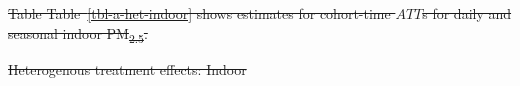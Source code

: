 \documentclass[
  letterpaper,
  DIV=11,
  numbers=noendperiod]{scrartcl}
\makeatletter
\renewenvironment{table}%
   {\renewcommand\familydefault\sfdefault
    \@float{table}}
   {\end@float}
\providecommand{\DIFdeltex}[1]{{\protect\color{red}\sout{#1}}}                      %
\providecommand{\DIFdelFL}[1]{\DIFdel{#1}} %
\providecommand{\DIFdel}[1]{\texorpdfstring{\DIFdeltex{#1}}{}} %
\makeatother
\begin{document}

\DIFdel{Table Table~\ref{tbl-a-het-indoor} shows estimates for cohort-time
\(ATT\)s for daily and seasonal indoor PM\textsubscript{2.5}.
}%

{%
\DIFdelFL{Heterogenous treatment effects: Indoor }}%
\end{document}

